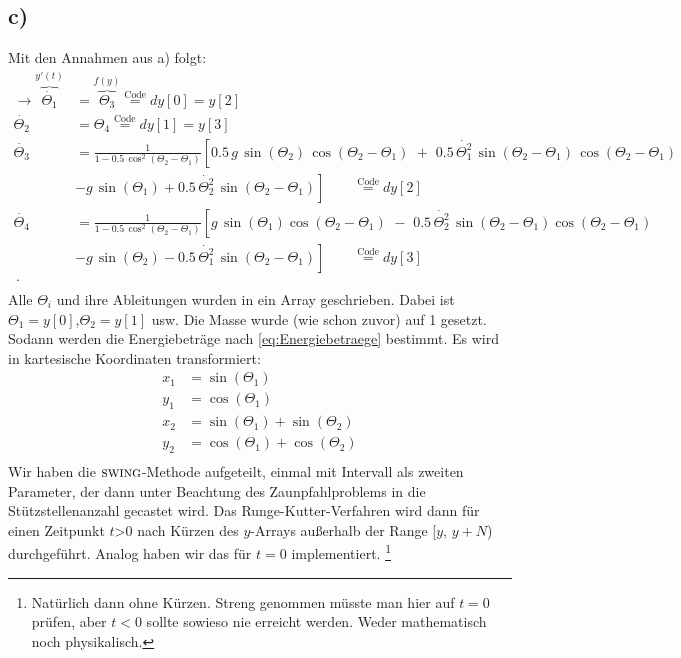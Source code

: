 \subsection*{c)}
Mit den Annahmen aus a) folgt:
\begin{equation*}
  \begin{split}
  	\rightarrow \overbrace{\dot{\Theta_1}}^{y'(t)} &= \overbrace{\Theta_3}^{f(y)} \stackrel{\text{Code}}{=} dy[0] = y[2]\\
  	\dot{\Theta_2} &= \Theta_4 \stackrel{\text{Code}}{=} dy[1] = y[3] \\
  	\dot{\Theta_3} &= \frac{1}{1-0.5\,\cos^2(\Theta_2-\Theta_1)} \left[ 0.5\,g\,\sin(\Theta_2)\,\cos(\Theta_2-\Theta_1)\,\, + \,\, 0.5\,\dot{\Theta_1^2}\,\sin(\Theta_2-\Theta_1)\,\cos(\Theta_2-\Theta_1)\right.  \\
  	&\left.-g\,\sin(\Theta_1)+ 0.5\, \dot{\Theta_2^2}\,\sin(\Theta_2-\Theta_1)\right] \qquad \stackrel{\text{Code}}{=}  dy[2]\\
  	\dot{\Theta_4} &= \frac{1}{1-0.5\,\cos^2(\Theta_2-\Theta_1)}\left[g\,\sin(\Theta_1)\cos(\Theta_2-\Theta_1)\,\,-\,\,0.5\,\dot{\Theta_2^2}\,\sin(\Theta_2-\Theta_1)\cos(\Theta_2-\Theta_1)\right. \\
		&\left.-g\,\sin(\Theta_2)-0.5\,\dot{\Theta_1^2}\,\sin(\Theta_2-\Theta_1)\right]\qquad \stackrel{\text{Code}}{=}  dy[3]\\\,. \\
  \end{split}
\end{equation*}
Alle $\Theta_i$ und ihre Ableitungen wurden in ein Array geschrieben. Dabei ist $\Theta_1 = y[0]$,$\Theta_2 = y[1]$ usw. Die Masse wurde (wie schon zuvor) auf 1 gesetzt. Sodann werden die Energiebeträge nach \eqref{eq:Energiebetraege} bestimmt. Es wird in kartesische Koordinaten transformiert:
\begin{equation}
 	\begin{split}
 		x_1 &= \sin(\Theta_1) \\
 		y_1 &= \cos(\Theta_1) \\
 		x_2 &= \sin(\Theta_1)+\sin(\Theta_2) \\
 		y_2 &= \cos(\Theta_1)+\cos(\Theta_2) \\ 		
 	\end{split}
 	\label{eq:kartKords}
\end{equation}
Wir haben die $\textsc{swing}$-Methode aufgeteilt, einmal mit Intervall als zweiten Parameter, der dann unter Beachtung des Zaunpfahlproblems in die Stützstellenanzahl gecastet wird. Das Runge-Kutter-Verfahren wird dann für einen Zeitpunkt $t$>0 nach Kürzen des $y$-Arrays außerhalb der Range [$y$, $y+N$) durchgeführt. Analog haben wir das für $t=0$ implementiert. \footnote{Natürlich dann ohne Kürzen. Streng genommen müsste man hier auf $t=0$ prüfen, aber $t<0$ sollte sowieso nie erreicht werden. Weder mathematisch noch physikalisch.}
